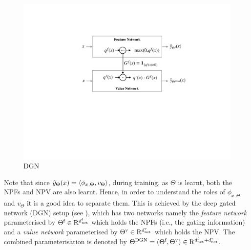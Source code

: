 \begin{figure}[h]
\centering
\includegraphics[scale=0.25]{figs/dgn-nips.pdf}
\caption{DGN}
\label{fig:dgn}
\end{figure}
Note that since $\hat{y}_{\Theta}(x)=\langle \phi_{x,\Theta},v_{\Theta}\rangle$, during training, as $\Theta$ is learnt, both the NPFs and NPV are also learnt. Hence, in order to understand the roles of $\phi_{x,\Theta}$ and $v_{\Theta}$ it is a good idea to separate them. This is achieved by the deep gated network (DGN) setup (see ), which has two networks namely the \emph{feature network} parameterised by $\Theta^{\textrm{f}}\in\mathrm{R}^{d^{\text{f}}_{\text{net}}}$ which holds the NPFs (i.e., the gating information) and a \emph{value network} parameterised by ${\Theta}^{\text{v}}\in\mathrm{R}^{d^{\text{v}}_{\text{net}}}$ which holds the NPV.  The combined parameterisation is denoted by $\Theta^{\text{DGN}}=(\Theta^{\textrm{f}},{\Theta}^{\text{v}})\in \mathrm{R}^{d^{\text{f}}_{\text{net}}+d^{\text{v}}_{\text{net}}}$.  


